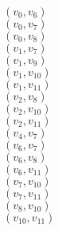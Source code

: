 \documentclass[a4paper,12pt]{article}
\begin{document}
$(v_{0},v_{6})$\\
$(v_{0},v_{7})$\\
$(v_{0},v_{8})$\\
$(v_{1},v_{7})$\\
$(v_{1},v_{9})$\\
$(v_{1},v_{10})$\\
$(v_{1},v_{11})$\\
$(v_{2},v_{8})$\\
$(v_{2},v_{10})$\\
$(v_{2},v_{11})$\\
$(v_{4},v_{7})$\\
$(v_{6},v_{7})$\\
$(v_{6},v_{8})$\\
$(v_{6},v_{11})$\\
$(v_{7},v_{10})$\\
$(v_{7},v_{11})$\\
$(v_{8},v_{10})$\\
$(v_{10},v_{11})$\\
\end{document}
